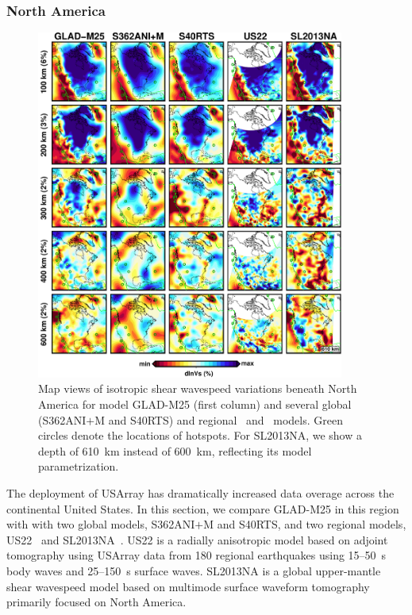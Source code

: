 \documentclass[extra,mreferee]{gji}
\begin{document}
\subsubsection{North America}

\begin{figure}
\centering
\includegraphics[width=0.9\textwidth]{figures/depth_slice/america_vs.pdf}
  \caption{Map views of isotropic shear wavespeed variations beneath North America 
  for model GLAD-M25 (first column) and several global (S362ANI$+$M and S40RTS)
  and regional~\citep[US22;][]{zhu2017radial} and~\citep[SL2013NA;][]{schaeffer2014imaging}
  models. Green circles denote the locations of hotspots. For SL2013NA, we
  show a depth of 610~km instead of 600~km, reflecting its model parametrization.}
\label{fig:america-vs}
\end{figure}

The deployment of USArray has dramatically increased data overage across the
continental United States.
In this section, we compare GLAD-M25 in this region with
with two global models, S362ANI$+$M and S40RTS, and two regional models,
US22~\citep{zhu2017radial} and SL2013NA~\citep{schaeffer2014imaging}.
US22 is a radially anisotropic model based on adjoint tomography using
USArray data from 180 regional earthquakes using 15--50~s
body waves and 25--150~s surface waves.
SL2013NA is a global upper-mantle shear wavespeed model based on multimode
surface waveform tomography primarily focused on North America.
\end{document}
